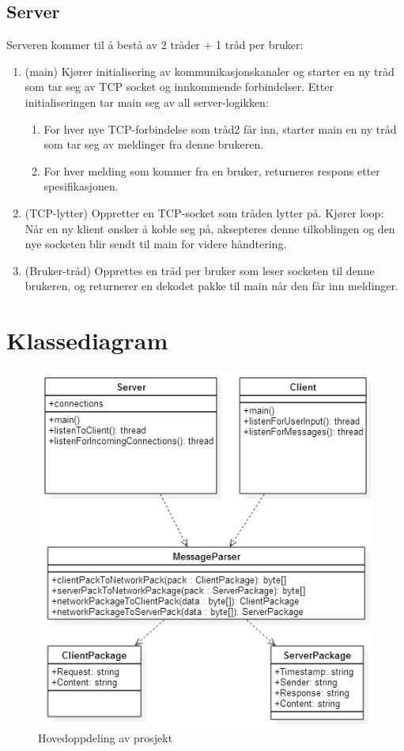 \documentclass[12pt,a4paper,norsk]{article}
\begin{document}
\subsection{Server}
Serveren kommer til å bestå av 2 tråder + 1 tråd per bruker:
\begin{enumerate}
	\item (main) Kjører initialisering av kommunikasjonskanaler og starter en ny tråd som tar seg av TCP socket og innkommende forbindelser. Etter initialiseringen tar main seg av all server-logikken:
	\begin{enumerate}
	\item For hver nye TCP-forbindelse som tråd2 får inn, starter main en ny tråd som tar seg av meldinger fra denne brukeren.
	\item For hver melding som kommer fra en bruker, returneres respons etter spesifikasjonen.
	\end{enumerate}
	\item (TCP-lytter) Oppretter en TCP-socket som tråden lytter på. Kjører loop: Når en ny klient ønsker å koble seg på, aksepteres denne tilkoblingen og den nye socketen blir sendt til main for videre håndtering.
	\item (Bruker-tråd) Opprettes en tråd per bruker som leser socketen til denne brukeren, og returnerer en dekodet pakke til main når den får inn meldinger.
\end{enumerate}
\newpage

\section{Klassediagram}
\begin{figure}[ht!]
    \centering
    \includegraphics[width=\textwidth]{class_diagram.png}
    \caption{Hovedoppdeling av prosjekt}
    \label{class}
\end{figure}
\newpage
\end{document}
